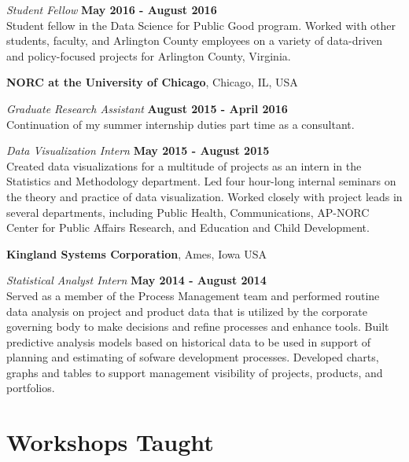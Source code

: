 \documentclass[margin,line]{res}
\begin{document}
\begin{resume}
\vspace{-.3cm}

{\em Student Fellow} \hfill {\bf May 2016 - August 2016}\\
Student fellow in the Data Science for Public Good program. Worked with other students, faculty, and Arlington County employees  on a variety of data-driven and policy-focused projects for Arlington County, Virginia. 


{\bf NORC at the University of Chicago}, Chicago, IL, USA

\vspace{-.3cm}

{\em Graduate Research Assistant} \hfill {\bf August 2015 - April 2016}\\
Continuation of my summer internship duties part time as a consultant.  



{\em Data Visualization Intern} \hfill {\bf May 2015 - August 2015}\\
Created data visualizations for a multitude of projects as an intern in the Statistics and Methodology department. Led four hour-long internal seminars on the theory and practice of data visualization. Worked closely with project leads in several departments, including Public Health, Communications, AP-NORC Center for Public Affairs Research, and Education and Child Development. 

{\bf Kingland Systems Corporation}, Ames, Iowa USA

\vspace{-.3cm}

{\em Statistical Analyst Intern} \hfill {\bf May 2014 - August 2014}\\
Served as a member of the Process Management team and performed routine data analysis on project and product data that is utilized by the corporate governing body to make decisions and refine processes and enhance tools. Built predictive analysis models based on historical data to be used in support of planning and estimating of sofware development processes. Developed charts, graphs and tables to support management visibility of projects, products, and portfolios. 

\section{\sc Workshops Taught}


\end{resume}
\end{document}

